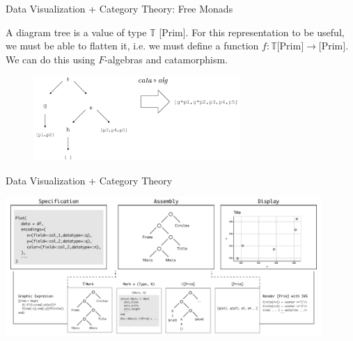\documentclass[aspectratio=169,xcolor=dvipsnames,10pt]{beamer}
\theoremstyle{definition}
\begin{document}
\begin{frame}[fragile]{Data Visualization + Category Theory: Free Monads}

    A diagram tree is a value of type $\mathbb T$ [Prim]. For this representation to
  be useful, we must be able to flatten it, i.e.
  we must define a function $f: \mathbb T\text{[Prim]} \to \text{[Prim]}$.
  We can do this using $F$-algebras and catamorphism.

  \begin{figure}
    \begin{center}
        \includegraphics[width=0.7\textwidth]{./figs/flattree.pdf}
    \end{center}
  \end{figure}
\end{frame}

\begin{frame}[fragile]{Data Visualization + Category Theory}
    \begin{center}
        \includegraphics[width=0.9\textwidth]{./figs/pipe.pdf}
    \end{center}
\end{frame}
\end{document}
